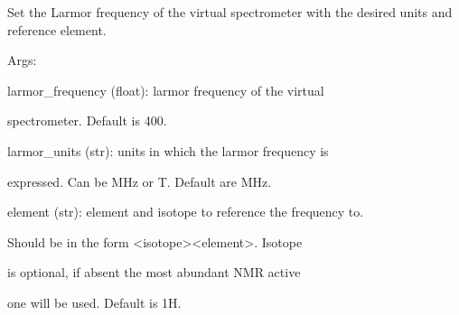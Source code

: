 \documentclass[letterpaper,10pt,english]{sphinxmanual}
\begin{document}
\begin{fulllineitems}
\begin{fulllineitems}
\end{fulllineitems}


\begin{fulllineitems}
\label{doctree/soprano.calculate.nmr.nmr:soprano.calculate.nmr.nmr.NMRCalculator.set_larmor_frequency}
Set the Larmor frequency of the virtual spectrometer with the desired
units and reference element.

\begin{DUlineblock}{0em}
\item[] Args:
\item[]
\begin{DUlineblock}{\DUlineblockindent}
\item[] larmor\_frequency (float): larmor frequency of the virtual
\item[]
\begin{DUlineblock}{\DUlineblockindent}
\item[] spectrometer. Default is 400.
\end{DUlineblock}
\item[] larmor\_units (str): units in which the larmor frequency is
\item[]
\begin{DUlineblock}{\DUlineblockindent}
\item[] expressed. Can be MHz or T. Default are MHz.
\end{DUlineblock}
\item[] element (str): element and isotope to reference the frequency to.
\item[]
\begin{DUlineblock}{\DUlineblockindent}
\item[] Should be in the form \textless{}isotope\textgreater{}\textless{}element\textgreater{}. Isotope
\item[] is optional, if absent the most abundant NMR active
\item[] one will be used. Default is 1H.
\end{DUlineblock}
\end{DUlineblock}
\end{DUlineblock}

\end{fulllineitems}



\end{fulllineitems}
\end{document}
